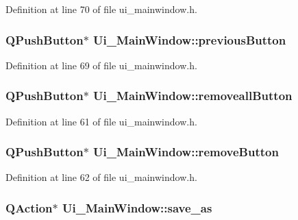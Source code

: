 Definition at line 70 of file ui\_\-mainwindow.h.

\hypertarget{classUi__MainWindow_a815d904c6cdc28fc7037862121696ade}{
\subsubsection[{previousButton}]{\setlength{\rightskip}{0pt plus 5cm}QPushButton$\ast$ {\bf Ui\_\-MainWindow::previousButton}}}
\label{classUi__MainWindow_a815d904c6cdc28fc7037862121696ade}


Definition at line 69 of file ui\_\-mainwindow.h.

\hypertarget{classUi__MainWindow_ab1e1013dda0abf675c1b37639a0b8f51}{
\subsubsection[{removeallButton}]{\setlength{\rightskip}{0pt plus 5cm}QPushButton$\ast$ {\bf Ui\_\-MainWindow::removeallButton}}}
\label{classUi__MainWindow_ab1e1013dda0abf675c1b37639a0b8f51}


Definition at line 61 of file ui\_\-mainwindow.h.

\hypertarget{classUi__MainWindow_ae4ea0ab11a595b2a964115c05f7603f4}{
\subsubsection[{removeButton}]{\setlength{\rightskip}{0pt plus 5cm}QPushButton$\ast$ {\bf Ui\_\-MainWindow::removeButton}}}
\label{classUi__MainWindow_ae4ea0ab11a595b2a964115c05f7603f4}


Definition at line 62 of file ui\_\-mainwindow.h.

\hypertarget{classUi__MainWindow_aecff87ababbfe64a3e91c5129cba2274}{
\subsubsection[{save\_\-as}]{\setlength{\rightskip}{0pt plus 5cm}QAction$\ast$ {\bf Ui\_\-MainWindow::save\_\-as}}}
\label{classUi__MainWindow_aecff87ababbfe64a3e91c5129cba2274}


